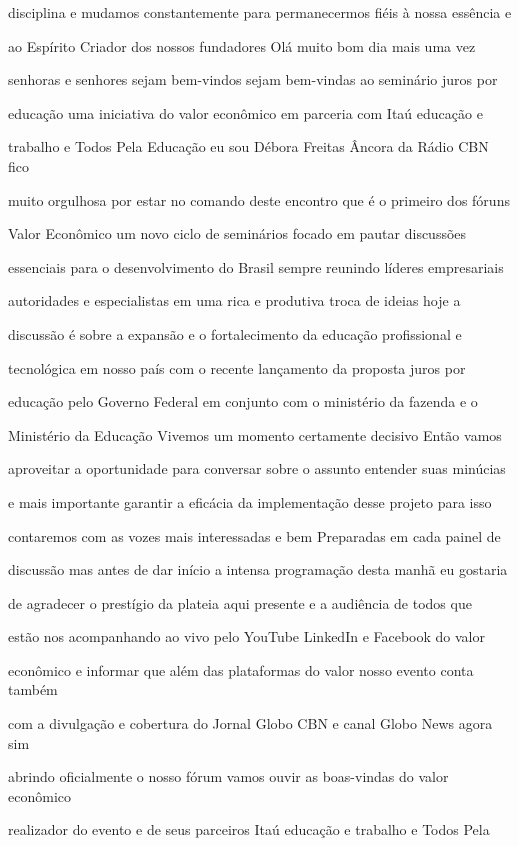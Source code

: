 \documentclass[a4paper,12pt]{article}
\begin{document}
disciplina e mudamos constantemente para permanecermos fiéis à nossa essência e

ao Espírito Criador dos nossos fundadores Olá muito bom dia mais uma vez

senhoras e senhores sejam bem-vindos sejam bem-vindas ao seminário juros por

educação uma iniciativa do valor econômico em parceria com Itaú educação e

trabalho e Todos Pela Educação eu sou Débora Freitas Âncora da Rádio CBN fico

muito orgulhosa por estar no comando deste encontro que é o primeiro dos fóruns

Valor Econômico um novo ciclo de seminários focado em pautar discussões

essenciais para o desenvolvimento do Brasil sempre reunindo líderes empresariais

autoridades e especialistas em uma rica e produtiva troca de ideias hoje a

discussão é sobre a expansão e o fortalecimento da educação profissional e

tecnológica em nosso país com o recente lançamento da proposta juros por

educação pelo Governo Federal em conjunto com o ministério da fazenda e o

Ministério da Educação Vivemos um momento certamente decisivo Então vamos

aproveitar a oportunidade para conversar sobre o assunto entender suas minúcias

e mais importante garantir a eficácia da implementação desse projeto para isso

contaremos com as vozes mais interessadas e bem Preparadas em cada painel de

discussão mas antes de dar início a intensa programação desta manhã eu gostaria

de agradecer o prestígio da plateia aqui presente e a audiência de todos que

estão nos acompanhando ao vivo pelo YouTube LinkedIn e Facebook do valor

econômico e informar que além das plataformas do valor nosso evento conta também

com a divulgação e cobertura do Jornal Globo CBN e canal Globo News agora sim

abrindo oficialmente o nosso fórum vamos ouvir as boas-vindas do valor econômico

realizador do evento e de seus parceiros Itaú educação e trabalho e Todos Pela
\end{document}
